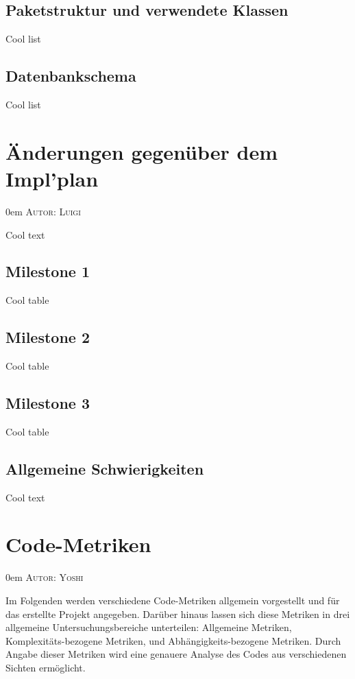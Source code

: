 \documentclass{article}
\makeatletter
\newcommand{\sectionauthor}[1]{
	{\parindent 0em \large \scshape Autor: #1 \par \nobreak \vspace*{1em}}
	\@afterheading
}
\makeatother
\begin{document}
\subsection{Paketstruktur und verwendete Klassen}
Cool list

\subsection{Datenbankschema}
Cool list

\section{Änderungen gegenüber dem Impl'plan}
\sectionauthor{Luigi}
Cool text

\subsection{Milestone 1}
Cool table

\subsection{Milestone 2}
Cool table

\subsection{Milestone 3}
Cool table

\subsection{Allgemeine Schwierigkeiten}
Cool text

\section{Code-Metriken}
\sectionauthor{Yoshi}

Im Folgenden werden verschiedene Code-Metriken allgemein vorgestellt und für das erstellte Projekt angegeben. 
Darüber hinaus lassen sich diese Metriken in drei allgemeine Untersuchungsbereiche unterteilen: 
Allgemeine Metriken, Komplexitäts-bezogene Metriken, und Abhängigkeits-bezogene Metriken.
Durch Angabe dieser Metriken wird eine genauere Analyse des Codes aus verschiedenen Sichten ermöglicht.
\end{document}
